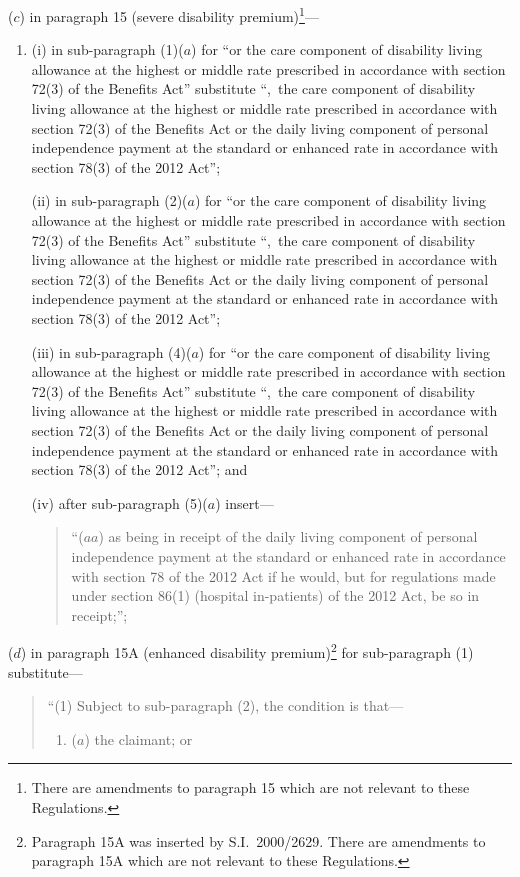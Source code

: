 \documentclass[12pt,a4paper]{article}
\begin{document}
\begin{enumerate}
($c$) in paragraph 15 (severe disability premium)\footnote{There are amendments to paragraph 15 which are not relevant to these Regulations.}—
\begin{enumerate}\item[]
(i) in sub-paragraph (1)($a$)  for “or the care component of disability living allowance at the highest or middle rate prescribed in accordance with section 72(3) of the Benefits Act” substitute “,~the care component of disability living allowance at the highest or middle rate prescribed in accordance with section 72(3) of the Benefits Act or the daily living component of personal independence payment at the standard or enhanced rate in accordance with section 78(3) of the 2012 Act”;

(ii) in sub-paragraph (2)($a$)  for “or the care component of disability living allowance at the highest or middle rate prescribed in accordance with section 72(3) of the Benefits Act” substitute “,~the care component of disability living allowance at the highest or middle rate prescribed in accordance with section 72(3) of the Benefits Act or the daily living component of personal independence payment at the standard or enhanced rate in accordance with section 78(3) of the 2012 Act”;

(iii) in sub-paragraph (4)($a$)  for “or the care component of disability living allowance at the highest or middle rate prescribed in accordance with section 72(3) of the Benefits Act” substitute “,~the care component of disability living allowance at the highest or middle rate prescribed in accordance with section 72(3) of the Benefits Act or the daily living component of personal independence payment at the standard or enhanced rate in accordance with section 78(3) of the 2012 Act”; and

(iv) after sub-paragraph (5)($a$)  insert—
\begin{quotation}
“($aa$) as being in receipt of the daily living component of personal independence payment at the standard or enhanced rate in accordance with section 78 of the 2012 Act if he would, but for regulations made under section 86(1) (hospital in-patients) of the 2012 Act, be so in receipt;”;
\end{quotation}
\end{enumerate}

($d$) in paragraph 15A (enhanced disability premium)\footnote{Paragraph 15A was inserted by S.I.~2000/2629. There are amendments to paragraph 15A which are not relevant to these Regulations.} for sub-paragraph (1) substitute—
\begin{quotation}
“(1) Subject to sub-paragraph (2), the condition is that—
\begin{enumerate}\item[]
($a$) the claimant; or


\end{enumerate}
\end{quotation}
\end{enumerate}
\end{document}
